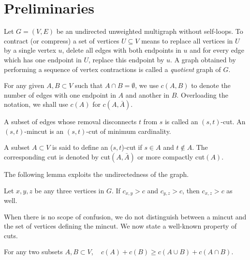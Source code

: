 \chapter{Preliminaries}


Let $G=(V,E)$ be an undirected unweighted multigraph without self-loops. To contract (or compress) a set of vertices $U\subseteq V$ means to replace all vertices in $U$ by a single vertex $u$, delete all edges with both endpoints in $u$ and for every edge which has one endpoint in $U$, replace this endpoint by $u$. A graph obtained by performing a sequence of vertex contractions is called a {\em quotient} graph of $G$.


For any given $A,B\subset V$ such that $A\cap B=\emptyset$, we use $c(A,B)$ to denote the number of edges with one endpoint in $A$
and another in $B$. Overloading the notation, we shall use $c(A)$ for $c(A,\bar{A})$.

\begin{definition}[$(s,t)$-cut]
A subset of edges whose removal disconnects $t$ from $s$ is called an $(s,t)$-cut. An $(s,t)$-mincut is an $(s,t)$-cut of minimum cardinality. 
\label{def:(u,v)-cut}
\end{definition}

\begin{definition}
A subset $A\subset V$ is said to define an ($s,t$)-cut if $s\in A$ and $t\notin A$. The corresponding cut is denoted by cut$(A,\bar{A})$ or more compactly cut$(A)$.  
\label{def:set-definiting-a-cut}
\end{definition}

The following lemma exploits the undirectedness of the graph.
\begin{lemma}
Let $x,y,z$ be any three vertices in $G$. If $c_{x,y}>c$ and $c_{y,z}>c$, then $c_{x,z}>c$ as well. 
\label{lem:triangle-inequality}
\end{lemma}

When there is no scope of confusion, we do not distinguish between a mincut and the set of vertices defining the mincut. 
We now state a well-known property of cuts.
\begin{lemma}
For any two subsets $A,B\subset V$, ~
$ c(A) +c(B) \ge c(A\cup B) + c(A\cap B)$.
\label{lem:submodularity}
\end{lemma}


